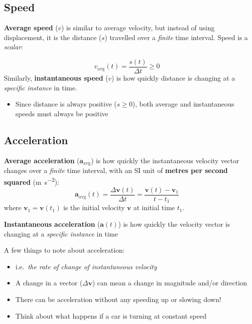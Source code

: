 \subsection{Speed}

\textbf{Average speed} ($v$) is similar to average velocity, but instead of
using displacement, it is the distance ($s$) travelled over a \emph{finite}
time interval. Speed is a \emph{scalar}:
  
\begin{equation}
  \boxed{
    v_\text{avg}(t)
    =\frac{s(t)}{\Delta t}\geq 0
  }
\end{equation}
Similarly, \textbf{instantaneous speed} ($v$) is how quickly
distance is changing at a \emph{specific instance} in time.
\begin{itemize}
\item Since distance is always positive ($s\ge 0$), both average and
  instantaneous speeds must always be positive
\end{itemize}




\subsection{Acceleration}

\textbf{Average acceleration} ($\mathbf a_\text{avg}$) is how quickly the
instantaneous velocity vector changes over a \emph{finite} time interval,
with an SI unit of \textbf{metres per second squared}
(\si{\metre\per\second\squared}):
\begin{equation}
  \boxed{\mathbf a_\text{avg}(t)
    =\frac{\Delta\mathbf v(t)}{\Delta t}
    =\frac{\mathbf v(t)-\mathbf v_1}{t-t_1}
  }
\end{equation}
where $\mathbf v_1=\mathbf v(t_1)$ is the initial velocity $\mathbf v$ at initial time
$t_1$.

\textbf{Instantaneous acceleration} ($\mathbf a(t)$) is how quickly the velocity
vector is changing at a \emph{specific instance} in time

A few things to note about acceleration:
\begin{itemize}
\item i.e.\ \emph{the rate of change of instantaneous velocity}
\item A change in a vector ($\Delta\mathbf v$) can mean a change in magnitude
  and/or direction
\item There can be acceleration without any speeding up or slowing down!
\item Think  about what happens if a car is turning at constant speed
\end{itemize}




